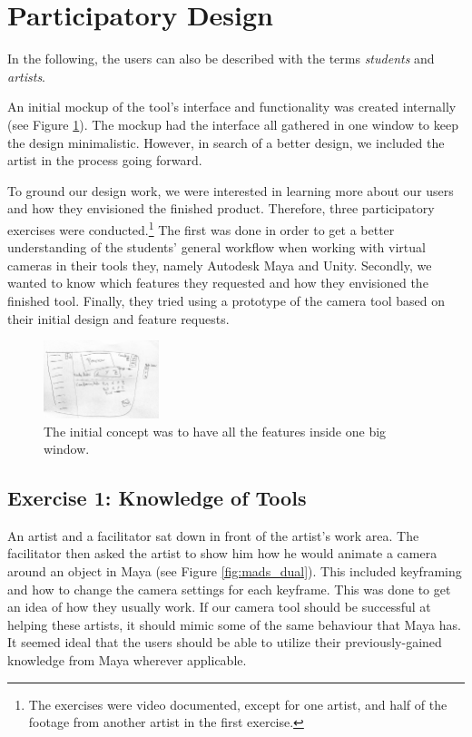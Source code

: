 \section{Participatory Design}
In the following, the users can also be described with the terms \textit{students} and \textit{artists}.


An initial mockup of the tool's interface and functionality was created internally (see Figure \ref{fig:mockup}). The mockup had the interface all gathered in one window to keep the design minimalistic. However, in search of a better design, we included the artist in the process going forward.

To ground our design work, we were interested in learning more about our users and how they envisioned the finished product. Therefore, three participatory exercises were conducted.\footnote{The exercises were video documented, except for one artist, and half of the footage from another artist in the first exercise.} The first was done in order to get a better understanding of the students' general workflow when working with virtual cameras in their tools they, namely Autodesk Maya and Unity. Secondly, we wanted to know which features they requested and how they envisioned the finished tool. Finally, they tried using a prototype of the camera tool based on their initial design and feature requests.

\begin{figure}[htbp]
\centering
\includegraphics[width=0.30\textwidth]{Pics/InitialMockup}
\caption{The initial concept was to have all the features inside one big window.}
\label{fig:mockup}
\end{figure}

\subsection{Exercise 1: Knowledge of Tools} \label{exerciseOne}
An artist and a facilitator sat down in front of the artist's work area. The facilitator then asked the artist to show him how he would animate a camera around an object in Maya (see Figure \ref{fig:mads_dual}). This included keyframing and how to change the camera settings for each keyframe. This was done to get an idea of how they usually work. If our camera tool should be successful at helping these artists, it should mimic some of the same behaviour that Maya has. It seemed ideal that the users should be able to utilize their previously-gained knowledge from Maya wherever applicable.

